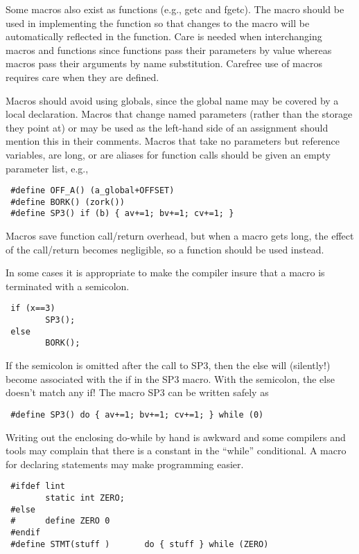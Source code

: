  Some macros also exist as functions (e.g., getc and fgetc). The macro should
be used in implementing the function so that changes to the macro will be
automatically reflected in the function. Care is needed when interchanging
macros and functions since functions pass their parameters by value whereas
macros pass their arguments by name substitution. Carefree use of macros
requires care when they are defined. 

 Macros should avoid using globals, since the global name may be covered by a
local declaration. Macros that change named parameters (rather than the storage
they point at) or may be used as the left-hand side of an assignment should
mention this in their comments. Macros that take no parameters but reference
variables, are long, or are aliases for function calls should be given an empty
parameter list, e.g., 

\begin{verbatim}
 #define OFF_A() (a_global+OFFSET)
 #define BORK() (zork())
 #define SP3() if (b) { av+=1; bv+=1; cv+=1; } 
\end{verbatim}

 Macros save function call/return overhead, but when a macro gets long, the
effect of the call/return becomes negligible, so a function should be used
instead. 

 In some cases it is appropriate to make the compiler insure that a macro is
terminated with a semicolon. 

\begin{verbatim}
 if (x==3)
        SP3();
 else
        BORK(); 
\end{verbatim}

If the semicolon is omitted after the call to SP3, then the else will
(silently!) become associated with the if in the SP3 macro. With the semicolon,
the else doesn't match any if! The macro SP3 can be written safely as 

\begin{verbatim}
 #define SP3() do { av+=1; bv+=1; cv+=1; } while (0)
\end{verbatim}

Writing out the enclosing do-while by hand is awkward and some compilers and
tools may complain that there is a constant in the ``while'' conditional. A
macro for declaring statements may make programming easier. 

\begin{verbatim}
 #ifdef lint
        static int ZERO;
 #else
 #      define ZERO 0
 #endif
 #define STMT(stuff )       do { stuff } while (ZERO) 
\end{verbatim}

